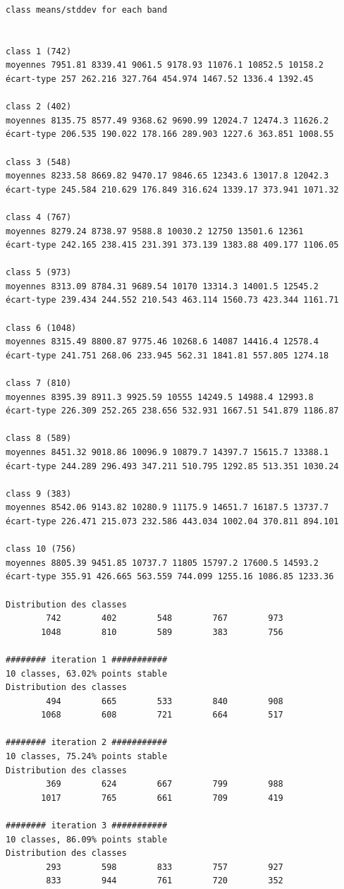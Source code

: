 \documentclass[analytics,article,submit,pdftex,moreauthors]{Definitions/mdpi}
\begin{document}
\begin{footnotesize}
\begin{verbatim}
class means/stddev for each band


class 1 (742)
moyennes 7951.81 8339.41 9061.5 9178.93 11076.1 10852.5 10158.2
écart-type 257 262.216 327.764 454.974 1467.52 1336.4 1392.45

class 2 (402)
moyennes 8135.75 8577.49 9368.62 9690.99 12024.7 12474.3 11626.2
écart-type 206.535 190.022 178.166 289.903 1227.6 363.851 1008.55

class 3 (548)
moyennes 8233.58 8669.82 9470.17 9846.65 12343.6 13017.8 12042.3
écart-type 245.584 210.629 176.849 316.624 1339.17 373.941 1071.32

class 4 (767)
moyennes 8279.24 8738.97 9588.8 10030.2 12750 13501.6 12361
écart-type 242.165 238.415 231.391 373.139 1383.88 409.177 1106.05

class 5 (973)
moyennes 8313.09 8784.31 9689.54 10170 13314.3 14001.5 12545.2
écart-type 239.434 244.552 210.543 463.114 1560.73 423.344 1161.71

class 6 (1048)
moyennes 8315.49 8800.87 9775.46 10268.6 14087 14416.4 12578.4
écart-type 241.751 268.06 233.945 562.31 1841.81 557.805 1274.18

class 7 (810)
moyennes 8395.39 8911.3 9925.59 10555 14249.5 14988.4 12993.8
écart-type 226.309 252.265 238.656 532.931 1667.51 541.879 1186.87

class 8 (589)
moyennes 8451.32 9018.86 10096.9 10879.7 14397.7 15615.7 13388.1
écart-type 244.289 296.493 347.211 510.795 1292.85 513.351 1030.24

class 9 (383)
moyennes 8542.06 9143.82 10280.9 11175.9 14651.7 16187.5 13737.7
écart-type 226.471 215.073 232.586 443.034 1002.04 370.811 894.101

class 10 (756)
moyennes 8805.39 9451.85 10737.7 11805 15797.2 17600.5 14593.2
écart-type 355.91 426.665 563.559 744.099 1255.16 1086.85 1233.36

Distribution des classes
        742        402        548        767        973
       1048        810        589        383        756

######## iteration 1 ###########
10 classes, 63.02% points stable
Distribution des classes
        494        665        533        840        908
       1068        608        721        664        517

######## iteration 2 ###########
10 classes, 75.24% points stable
Distribution des classes
        369        624        667        799        988
       1017        765        661        709        419

######## iteration 3 ###########
10 classes, 86.09% points stable
Distribution des classes
        293        598        833        757        927
        833        944        761        720        352


\end{verbatim}
\end{footnotesize}
\end{document}
